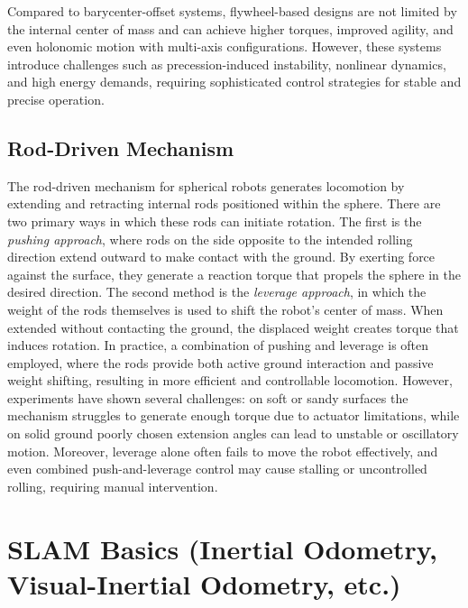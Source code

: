 \documentclass[english, bachelor, utf8]{base/thesis_telematics}
\begin{document}
Compared to barycenter-offset systems, flywheel-based designs are not limited by the internal center of mass and can achieve higher torques, improved agility, and even holonomic motion with multi-axis configurations.
However, these systems introduce challenges such as precession-induced instability, nonlinear dynamics, and high energy demands, requiring sophisticated control strategies for stable and precise operation.\cite{flywheel_hamaster_explanation}

\subsection{Rod-Driven Mechanism}
The rod-driven mechanism for spherical robots generates locomotion by extending and retracting internal rods positioned within the sphere. 
There are two primary ways in which these rods can initiate rotation. 
The first is the \textit{pushing approach}, where rods on the side opposite to the intended rolling direction extend outward to make contact with the ground. 
By exerting force against the surface, they generate a reaction torque that propels the sphere in the desired direction. 
The second method is the \textit{leverage approach}, in which the weight of the rods themselves is used to shift the robot’s center of mass. 
When extended without contacting the ground, the displaced weight creates torque that induces rotation. 
In practice, a combination of pushing and leverage is often employed, where the rods provide both active ground interaction and passive weight shifting, resulting in more efficient and controllable locomotion. 
However, experiments have shown several challenges: on soft or sandy surfaces the mechanism struggles to generate enough torque due to actuator limitations, while on solid ground poorly chosen extension angles can lead to unstable or oscillatory motion. 
Moreover, leverage alone often fails to move the robot effectively, and even combined push-and-leverage control may cause stalling or uncontrolled rolling, requiring manual intervention. \cite{rod_sphere}



\section{SLAM Basics (Inertial Odometry, Visual-Inertial Odometry, etc.)}
\end{document}
